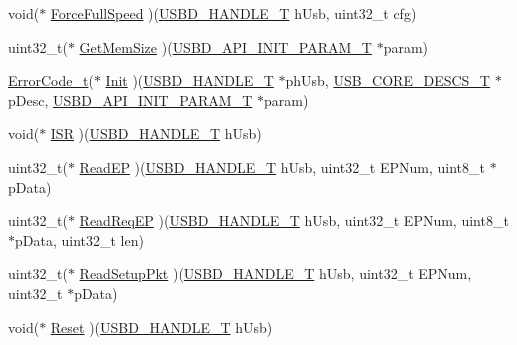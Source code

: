 \begin{DoxyCompactItemize}
\item 
void($\ast$ \hyperlink{structUSBD__HW__API_ac4a7b25e6c9ccede46fc9b8185325e39}{Force\+Full\+Speed} )(\hyperlink{group__USBD__Core_gafdbb2204d929cb9d75736bd2b42342ac}{U\+S\+B\+D\+\_\+\+H\+A\+N\+D\+L\+E\+\_\+T} h\+Usb, uint32\+\_\+t cfg)
\item 
uint32\+\_\+t($\ast$ \hyperlink{structUSBD__HW__API_a59a65bd037723d735b684c308d99fc54}{Get\+Mem\+Size} )(\hyperlink{group__USBD__Core_gaa6e8171941c1ae63afed95974e0f18e3}{U\+S\+B\+D\+\_\+\+A\+P\+I\+\_\+\+I\+N\+I\+T\+\_\+\+P\+A\+R\+A\+M\+\_\+T} $\ast$param)
\item 
\hyperlink{error_8h_a905255056c349318139d94aa4523d516}{Error\+Code\+\_\+t}($\ast$ \hyperlink{structUSBD__HW__API_adfa3d0348994e49354243951f2ac95c9}{Init} )(\hyperlink{group__USBD__Core_gafdbb2204d929cb9d75736bd2b42342ac}{U\+S\+B\+D\+\_\+\+H\+A\+N\+D\+L\+E\+\_\+T} $\ast$ph\+Usb, \hyperlink{group__USBD__Core_gabdc617d119eac0555f91bea957c41ecc}{U\+S\+B\+\_\+\+C\+O\+R\+E\+\_\+\+D\+E\+S\+C\+S\+\_\+T} $\ast$p\+Desc, \hyperlink{group__USBD__Core_gaa6e8171941c1ae63afed95974e0f18e3}{U\+S\+B\+D\+\_\+\+A\+P\+I\+\_\+\+I\+N\+I\+T\+\_\+\+P\+A\+R\+A\+M\+\_\+T} $\ast$param)
\item 
void($\ast$ \hyperlink{structUSBD__HW__API_a692e7cd9ee17c66281daad517ab5636d}{I\+SR} )(\hyperlink{group__USBD__Core_gafdbb2204d929cb9d75736bd2b42342ac}{U\+S\+B\+D\+\_\+\+H\+A\+N\+D\+L\+E\+\_\+T} h\+Usb)
\item 
uint32\+\_\+t($\ast$ \hyperlink{structUSBD__HW__API_a637042da839963e43c354ea184582080}{Read\+EP} )(\hyperlink{group__USBD__Core_gafdbb2204d929cb9d75736bd2b42342ac}{U\+S\+B\+D\+\_\+\+H\+A\+N\+D\+L\+E\+\_\+T} h\+Usb, uint32\+\_\+t E\+P\+Num, uint8\+\_\+t $\ast$p\+Data)
\item 
uint32\+\_\+t($\ast$ \hyperlink{structUSBD__HW__API_a24326b43822367a3c7ce46ffe70c7087}{Read\+Req\+EP} )(\hyperlink{group__USBD__Core_gafdbb2204d929cb9d75736bd2b42342ac}{U\+S\+B\+D\+\_\+\+H\+A\+N\+D\+L\+E\+\_\+T} h\+Usb, uint32\+\_\+t E\+P\+Num, uint8\+\_\+t $\ast$p\+Data, uint32\+\_\+t len)
\item 
uint32\+\_\+t($\ast$ \hyperlink{structUSBD__HW__API_ae8e43fb5e3029186b858971203735064}{Read\+Setup\+Pkt} )(\hyperlink{group__USBD__Core_gafdbb2204d929cb9d75736bd2b42342ac}{U\+S\+B\+D\+\_\+\+H\+A\+N\+D\+L\+E\+\_\+T} h\+Usb, uint32\+\_\+t E\+P\+Num, uint32\+\_\+t $\ast$p\+Data)
\item 
void($\ast$ \hyperlink{structUSBD__HW__API_a1d4278c750d621f59f3b25c28c46c263}{Reset} )(\hyperlink{group__USBD__Core_gafdbb2204d929cb9d75736bd2b42342ac}{U\+S\+B\+D\+\_\+\+H\+A\+N\+D\+L\+E\+\_\+T} h\+Usb)

\end{DoxyCompactItemize}
